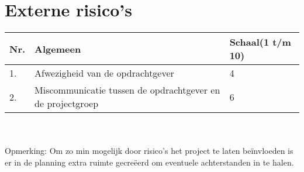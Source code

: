 \section{Externe risico's} \label{sec:Externe risicos}

\begin{left}
    \begin{tabular}{ | l | l | l | }
    	\hline
    	Nr. & Algemeen & Schaal(1 t/m 10) \\ \hline
    	1.	& Afwezigheid van de opdrachtgever & 4 \\ \hline
    	2.  & Miscommunicatie tussen de opdrachtgever en de projectgroep & 6 \\ \hline
  	\end{tabular}
\end{left}
\\
\\
Opmerking: Om zo min mogelijk door risico’s het project te laten beïnvloeden is er in de planning extra ruimte gecreëerd om eventuele achterstanden in te halen.